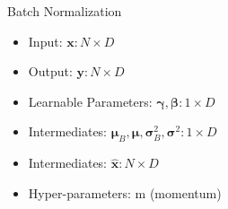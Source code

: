 
\begin{frame}{Batch Normalization}
	\begin{multicols}{2}
		\begin{itemize}
			\item Input: $\pmb{x}: N\times D$
			\item Output: $\pmb{y}: N\times D$
			\item Learnable Parameters: $\pmb{\gamma}, \pmb{\beta}: 1\times D$
			\item Intermediates: $\pmb{\mu}_B, \pmb{\mu}, \pmb{\sigma}_B^2, \pmb{\sigma}^2: 1\times D$
			\item Intermediates:  $\hat{\pmb{x}}: N \times D$
			\item Hyper-parameters: m (momentum)
		\end{itemize}
	\end{multicols}
\end{frame}

